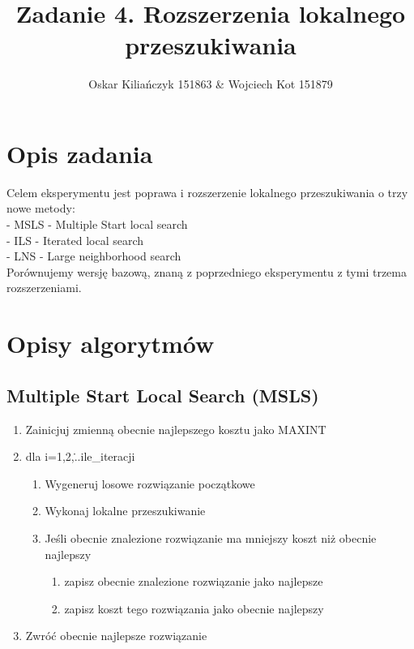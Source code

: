 \documentclass[11pt]{article}
\title{Zadanie 4. Rozszerzenia lokalnego przeszukiwania}
\author{Oskar Kiliańczyk 151863 \& Wojciech Kot 151879}
\date{}
\begin{document}
\maketitle
\newpage

\section{Opis zadania}\label{sec:opis-zadania}

Celem eksperymentu jest poprawa i rozszerzenie lokalnego przeszukiwania o trzy nowe metody:\\
- MSLS - Multiple Start local search\\
- ILS - Iterated local search\\
- LNS - Large neighborhood search\\
Porównujemy wersję bazową, znaną z poprzedniego eksperymentu z tymi trzema rozszerzeniami.\\


\section{Opisy algorytmów}\label{sec:opisy-alg}

\subsection{Multiple Start Local Search (MSLS)}\label{subsec:msls}
\begin{enumerate}
    \item Zainicjuj zmienną obecnie najlepszego kosztu jako MAXINT
    \item dla i=1,2,\...ile\_iteracji
    \begin{enumerate}
        \item Wygeneruj losowe rozwiązanie początkowe
        \item Wykonaj lokalne przeszukiwanie
        \item Jeśli obecnie znalezione rozwiązanie ma mniejszy koszt niż obecnie najlepszy
        \begin{enumerate}
            \item zapisz obecnie znalezione rozwiązanie jako najlepsze
            \item zapisz koszt tego rozwiązania jako obecnie najlepszy
        \end{enumerate}
    \end{enumerate}
    \item Zwróć obecnie najlepsze rozwiązanie
\end{enumerate}
\end{document}

